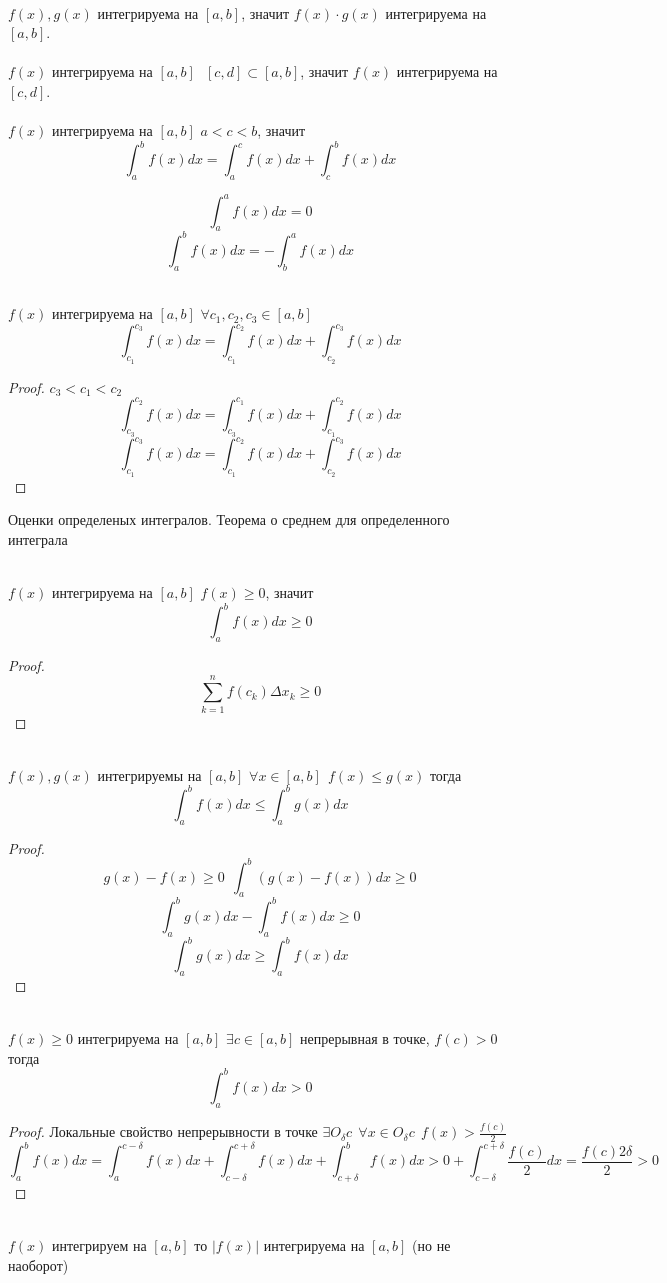 \\
$f(x),g(x)$ интегрируема на $[a,b]$, значит $f(x) \cdot g(x)$
интегрируема на $[a,b]$.\\
\\
 $f(x)$ интегрируема на $[a,b] ~~~ [c,d] \subset [a,b]$, значит
$f(x)$ интегрируема на $[c,d]$.\\
\\
$f(x)$ интегрируема на $[a,b]$ $a < c < b$, значит
    \[\int_a^b f(x)dx = \int_a^c f(x)dx + \int_c^b f(x)dx\]

\[
    \int_a^a f(x)dx = 0
\]
\[
    \int_a^b f(x)dx = - \int_b^a f(x)dx
\]

\\
$f(x)$ интегрируема на $[a, b]$ $\forall c_1, c_2, c_3 \in [a, b]$
    \[
    \int_{c_1}^{c_3} f(x)dx = \int_{c_1}^{c_2} f(x)dx + \int_{c_2}^{c_3} f(x)dx
    \]

\begin{proof}
  $c_3 < c_1 < c_2$
    \[
        \int_{c_3}^{c_2} f(x)dx = \int_{c_3}^{c_1}f(x)dx +
        \int_{c_1}^{c_2}f(x)dx
    \]
    \[
        \int_{c_1}^{c_3} f(x)dx = \int_{c_1}^{c_2}f(x)dx +
        \int_{c_2}^{c_3}f(x)dx
    \]
\end{proof}

\begin{title}[\Large]
    Оценки определеных интегралов. Теорема о среднем для определенного интеграла
\end{title}
\\
$f(x)$ интегрируема на $[a,b]$ $f(x) \ge 0$, значит
\[\int_a^b f(x)dx \ge 0\]
\begin{proof}
    \[\sum_{k=1}^{n} f(c_k)\Delta x_k \ge 0\]
\end{proof}
\\
    $f(x), g(x)$ интегрируемы на $[a, b]$ $\forall x \in [a, b] ~~ f(x)\le g(x)$
    тогда
    \[\int_a^b f(x)dx \le \int_a^b g(x)dx\]
\begin{proof}
    \[g(x) - f(x) \ge 0 ~~ \int_a^b (g(x) - f(x))dx \ge 0\]
    \[\int_a^b g(x)dx - \int_a^b f(x)dx \ge 0\]
    \[\int_a^b g(x)dx \ge \int_a^b f(x)dx \]
\end{proof}

\\
$f(x) \ge 0$ интегрируема на $[a, b]$ $\exists c \in [a, b]$ непрерывная в
точке, $f(c) > 0$ тогда \[\int_a^b f(x)dx > 0\]
\begin{proof}
    Локальные свойство непрерывности в точке $\exists O_{\delta}c ~~
    \forall x \in O_{\delta}c ~~ f(x) > \frac{f(c)}{2}$
    \[
        \int_a^b f(x)dx = \int_a^{c-\delta} f(x)dx +
        \int_{c-\delta}^{c+\delta} f(x)dx + \int_{c+\delta}^b f(x)dx >
        0 + \int_{c-\delta}^{c+\delta} \frac{f(c)}{2}dx
        = \frac{f(c) 2\delta}{2} > 0
    \]
\end{proof}
\\
$f(x)$ интегрируем на $[a, b]$ то $|f(x)|$ интегрируема на $[a,b]$
(но не наоборот)

